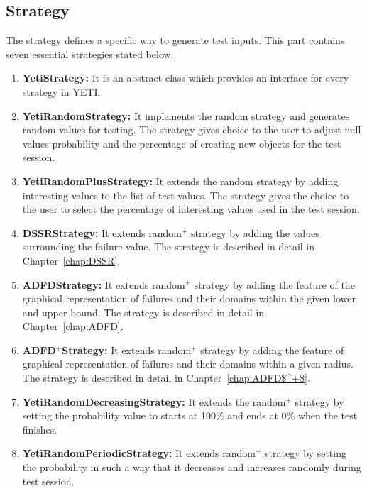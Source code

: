 \subsection{Strategy}
The strategy defines a specific way to generate test inputs. This part contains seven essential strategies stated below.
\begin{enumerate}
\item {\textbf{YetiStrategy:}} It is an abstract class which provides an interface for every strategy in YETI.
\item {\textbf{YetiRandomStrategy:}} It implements the random strategy and generates random values for testing. The strategy gives choice to the user to adjust null values probability and the percentage of creating new objects for the test session. 
\item {\textbf{YetiRandomPlusStrategy:}} It extends the random strategy by adding interesting values to the list of test values. The strategy gives the choice to the user to select the percentage of interesting values used in the test session.
\item {\textbf{DSSRStrategy:}} It extends random$^+$ strategy by adding the values surrounding the failure value. The strategy is described in detail in Chapter~\ref{chap:DSSR}.
\item {\textbf{ADFDStrategy:}} It extends random$^+$ strategy by adding the feature of the graphical representation of failures and their domains within the given lower and upper bound. The strategy is described in detail in Chapter~\ref{chap:ADFD}.
\item {\textbf{ADFD$^+$Strategy:}} It extends random$^+$ strategy by adding the feature of graphical representation of failures and their domains within a given radius. The strategy is described in detail in Chapter~\ref{chap:ADFD$^+$}.
\item {\textbf{YetiRandomDecreasingStrategy:}} It extends the random$^+$ strategy by setting the probability value to starts at 100\% and ends at 0\% when the test finishes.
\item {\textbf{YetiRandomPeriodicStrategy:}} It extends random$^+$ strategy by setting the probability in such a way that it decreases and increases randomly during test session.
\end{enumerate}


